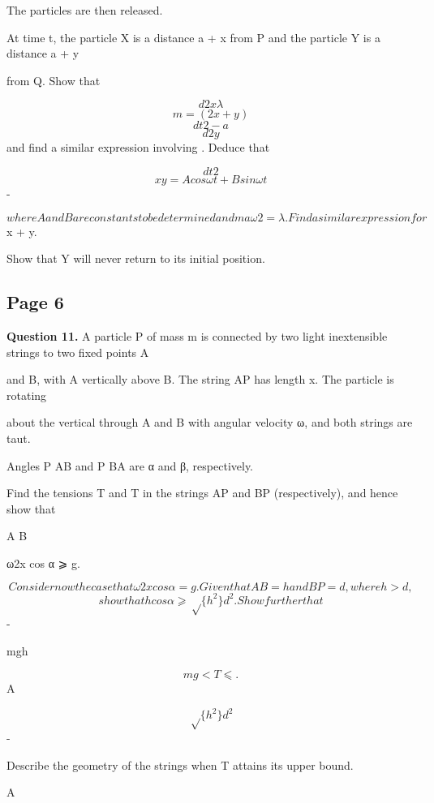 \documentclass[12pt]{article}
\begin{document}
\begin{flushleft}
The particles are then released.\par
At time t, the particle X is a distance a + x from P and the particle Y is a distance a + y\par
from Q. Show that\par
\[d2x λ\]
\[m = (2x + y)\]
\[dt2 - a\]
\[d2y\]
and find a similar expression involving . Deduce that\par
\[dt2\]
\[x y = A cos ωt + B sin ωt\]
-\par
\[where A and B are constants to be determined and maω2 = λ. Find a similar expression for\]
x + y.\par
Show that Y will never return to its initial position.\par
\end{flushleft}
\subsection*{Page 6}
\begin{flushleft}
\bigskip\textbf{Question 11.} A particle P of mass m is connected by two light inextensible strings to two fixed points A\par
and B, with A vertically above B. The string AP has length x. The particle is rotating\par
about the vertical through A and B with angular velocity ω, and both strings are taut.\par
Angles P AB and P BA are α and β, respectively.\par
Find the tensions T and T in the strings AP and BP (respectively), and hence show that\par
A B\par
ω2x cos α ⩾ g.\par
\[Consider now the case that ω2x cos α = g. Given that AB = h and BP = d, where h > d,\]
\[show that h cos α ⩾ \sqrt\{h^2\} d^2. Show further that\]
-\par
mgh\par
\[mg < T ⩽ .\]
A\par
\[\sqrt\{h^2\} d^2\]
-\par
Describe the geometry of the strings when T attains its upper bound.\par
A\par
\end{flushleft}
\end{document}
